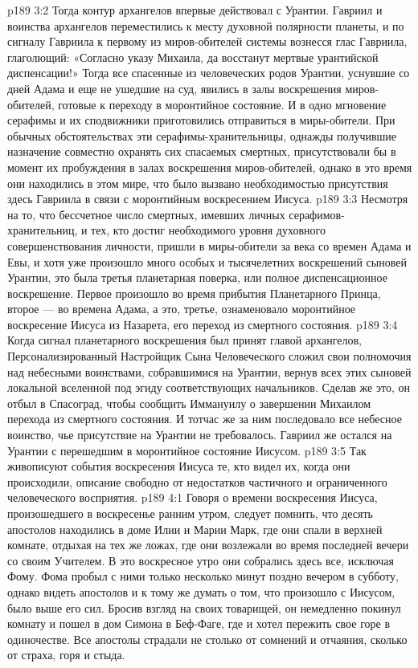 \vs p189 3:2 Тогда контур архангелов впервые действовал с Урантии. Гавриил и воинства архангелов переместились к месту духовной полярности планеты, и по сигналу Гавриила к первому из миров\hyp{}обителей системы вознесся глас Гавриила, глаголющий: «Согласно указу Михаила, да восстанут мертвые урантийской диспенсации!» Тогда все спасенные из человеческих родов Урантии, уснувшие со дней Адама и еще не ушедшие на суд, явились в залы воскрешения миров\hyp{}обителей, готовые к переходу в моронтийное состояние. И в одно мгновение серафимы и их сподвижники приготовились отправиться в миры\hyp{}обители. При обычных обстоятельствах эти серафимы\hyp{}хранительницы, однажды получившие назначение совместно охранять сих спасаемых смертных, присутствовали бы в момент их пробуждения в залах воскрешения миров\hyp{}обителей, однако в это время они находились в этом мире, что было вызвано необходимостью присутствия здесь Гавриила в связи с моронтийным воскресением Иисуса.
\vs p189 3:3 Несмотря на то, что бессчетное число смертных, имевших личных серафимов\hyp{}хранительниц, и тех, кто достиг необходимого уровня духовного совершенствования личности, пришли в миры\hyp{}обители за века со времен Адама и Евы, и хотя уже произошло много особых и тысячелетних воскрешений сыновей Урантии, это была третья планетарная поверка, или полное диспенсационное воскрешение. Первое произошло во время прибытия Планетарного Принца, второе --- во времена Адама, а это, третье, ознаменовало моронтийное воскресение Иисуса из Назарета, его переход из смертного состояния.
\vs p189 3:4 \pc Когда сигнал планетарного воскрешения был принят главой архангелов, Персонализированный Настройщик Сына Человеческого сложил свои полномочия над небесными воинствами, собравшимися на Урантии, вернув всех этих сыновей локальной вселенной под эгиду соответствующих начальников. Сделав же это, он отбыл в Спасоград, чтобы сообщить Иммануилу о завершении Михаилом перехода из смертного состояния. И тотчас же за ним последовало все небесное воинство, чье присутствие на Урантии не требовалось. Гавриил же остался на Урантии с перешедшим в моронтийное состояние Иисусом.
\vs p189 3:5 \pc Так живописуют события воскресения Иисуса те, кто видел их, когда они происходили, описание свободно от недостатков частичного и ограниченного человеческого восприятия.
\vs p189 4:1 Говоря о времени воскресения Иисуса, произошедшего в воскресенье ранним утром, следует помнить, что десять апостолов находились в доме Илии и Марии Марк, где они спали в верхней комнате, отдыхая на тех же ложах, где они возлежали во время последней вечери со своим Учителем. В это воскресное утро они собрались здесь все, исключая Фому. Фома пробыл с ними только несколько минут поздно вечером в субботу, однако видеть апостолов и к тому же думать о том, что произошло с Иисусом, было выше его сил. Бросив взгляд на своих товарищей, он немедленно покинул комнату и пошел в дом Симона в Беф\hyp{}Фаге, где и хотел пережить свое горе в одиночестве. Все апостолы страдали не столько от сомнений и отчаяния, сколько от страха, горя и стыда.
